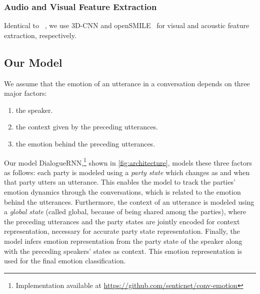 \documentclass[letterpaper]{article} %
\newcommand{\citet}[1]
{\citeauthor{#1}~\shortcite{#1}}
\begin{document}
\subsubsection{Audio and Visual Feature Extraction}
\label{sec:visu-feat-extr}
Identical to \citet{hazarika-EtAl:2018:N18-1}, we use 3D-CNN and openSMILE~\cite{eyben2010opensmile} for visual and acoustic feature extraction, respectively.




\subsection{Our Model}
\label{sec:model}

We assume that the emotion of an utterance in a conversation depends on three
major factors:
\begin{enumerate}
\item the speaker.
\item the context given by the preceding utterances.
\item the emotion behind the preceding utterances.
\end{enumerate}
Our model DialogueRNN,\footnote{Implementation available at
\url{https://github.com/senticnet/conv-emotion}}
shown in \cref{fig:architecture}, models these three factors as follows:
each party is modeled using a \textit{party state} which changes as and when that party utters an utterance. This enables the model to track the parties' emotion dynamics 
through the conversations, which is related to the emotion behind the utterances.
Furthermore, the context of an utterance is modeled using a \textit{global state}
(called global, because of being shared among the parties), where the preceding
utterances and the party states are jointly encoded for context representation,
necessary for accurate party state representation. Finally, the model infers emotion
representation from the party state of the speaker along with the preceding speakers' states as
context. This emotion representation is used for the final emotion classification.
\end{document}
